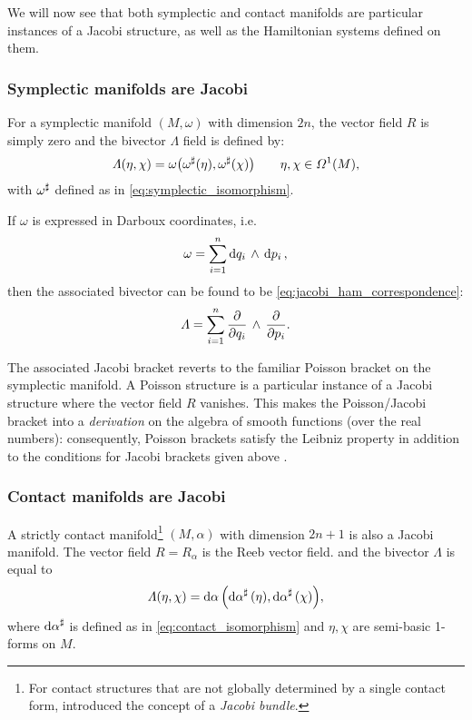 We will now see that both symplectic and contact manifolds are particular instances of a Jacobi structure, as well as the Hamiltonian systems defined on them.

\subsubsection{Symplectic manifolds are Jacobi}
For a symplectic manifold \((M, \omega)\) with dimension \(2n\), the vector field \(R\) is simply zero and the bivector \(\Lambda\) field is defined by:
\begin{equation}
     \Lambda(\eta, \chi) = \omega\qty(\omega^\sharp(\eta), \omega^\sharp(\chi)) \qquad \eta, \chi \in \Omega^{1}(M),
\end{equation}
with \(\omega^\sharp\) defined as in \cref{eq:symplectic_isomorphism}. 

If \(\omega\) is expressed in Darboux coordinates, i.e.
\begin{equation}
     \omega = \sum^n_{i = 1}  \dd{q_i}\,\wedge\,\dd{p_i} ,
\end{equation}
then the associated bivector can be found to be \cref{eq:jacobi_ham_correspondence}:
\begin{equation}
     \Lambda = \sum^n_{i = 1}  \pdv{}{q_i}\,\wedge\,\pdv{}{p_i} .
\end{equation}

The associated Jacobi bracket reverts to the familiar Poisson bracket on the symplectic manifold. A Poisson structure is a particular instance of a Jacobi structure where the vector field \(R\) vanishes. This makes the Poisson/Jacobi bracket into a \emph{derivation} on the algebra of smooth functions (over the real numbers): consequently, Poisson brackets satisfy the Leibniz property in addition to the conditions for Jacobi brackets given above \cite{marle1991}.

\subsubsection{Contact manifolds are Jacobi}
A strictly contact manifold\footnote{For contact structures that are not globally determined by a single contact form, \citet{marle1991} introduced the concept of a \emph{Jacobi bundle}.} \((M, \alpha)\) with dimension \(2n + 1\) is also a Jacobi manifold. The vector field \(R = R_\alpha\) is the Reeb vector field. 
and the bivector \(\Lambda\) is equal to
\begin{equation}
     \Lambda(\eta, \chi) = \dd{\alpha}\qty(\dd{\alpha}^\sharp(\eta), \dd{\alpha}^\sharp(\chi)),
\end{equation}
where \(\dd{\alpha}^\sharp\) is defined as in \cref{eq:contact_isomorphism} and \(\eta,\chi\) are semi-basic 1-forms on \(M\).

